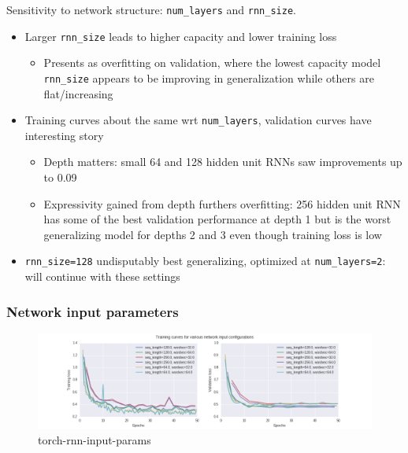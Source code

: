 \documentclass[dissertation.tex]{subfiles}
\begin{document}
Sensitivity to network structure: \texttt{num\_layers} and \texttt{rnn\_size}.
\begin{itemize}
    \item Larger \texttt{rnn\_size} leads to higher capacity and lower training loss
        \begin{itemize}
            \item Presents as overfitting on validation, where the lowest capacity
                model \texttt{rnn\_size} appears to be improving in generalization while
                others are flat/increasing
        \end{itemize}
    \item Training curves about the same wrt \texttt{num\_layers}, validation curves have interesting story
        \begin{itemize}
            \item Depth matters: small 64 and 128 hidden unit RNNs saw improvements up to 0.09
            \item Expressivity gained from depth furthers overfitting: 256
                hidden unit RNN has some of the best validation performance at
                depth 1 but is the worst generalizing model for depths 2
                and 3 even though training loss is low
        \end{itemize}
    \item \texttt{rnn\_size=128} undisputably best generalizing, optimized at
        \texttt{num\_layers=2}: will continue with these settings
\end{itemize}

\subsubsection{Network input parameters}


\begin{figure}[htpb]
    \centering
    \includegraphics[width=\linewidth]{Figures/torch-rnn-input-params.png}
    \caption{torch-rnn-input-params}
    \label{fig:torch-rnn-input-params}
\end{figure}
\end{document}
